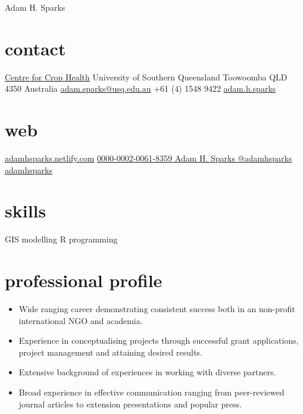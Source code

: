 
\hfill {\Huge Adam H. Sparks}
\begin{aside}
\small{\section{contact}}
\small{\href{http://www.usq.edu.au/research/research-at-usq/institutes-centres/cch}{Centre for Crop Health}}
\small{University of Southern Queensland}
\small{Toowoomba QLD 4350}
\small{Australia}
\small{\href{mailto:adam.sparks@usq.edu.au}{adam.sparks@usq.edu.au}}
\small{+61 (4) 1548 9422 \faMobilePhone{}}
\small{\href{skype:adam.h.sparks?call}{adam.h.sparks }}
\section{web}
	\footnotesize{\href{https://adamhsparks.netlify.com}{adamhsparks.netlify.com}\FA {}}
\footnotesize{\href{http://orcid.org/0000-0002-0061-8359}{0000-0002-0061-8359 {\color{orcid.green}}}}
\footnotesize{\href{https://www.linkedin.com/in/adam-h-sparks-507b968}{Adam H. Sparks {\color{linkedin}\FA {}}}}
\footnotesize{\href{https://www.twitter.com/adamhsparks/}{@adamhsparks {\color{twitter.blue}\FA {}}}}
\footnotesize{\href{https://github.com/adamhsparks/}{adamhsparks \FA {}}}
\footnotesize{\section{skills}}
\small{GIS}
\small{modelling}
\small{R programming}
\end{aside}

\section*{professional profile}

\begin{itemize}
\setlength{\leftmargin}{0pt}
\item Wide ranging career demonstrating consistent success both in an non-profit international NGO and academia.
\item Experience in conceptualising projects through successful grant applications, project management and attaining desired results.
\item Extensive background of experiences in working with diverse partners.
\item Broad experience in effective communication ranging from peer-reviewed journal articles to extension presentations and popular press.
\end{itemize}


